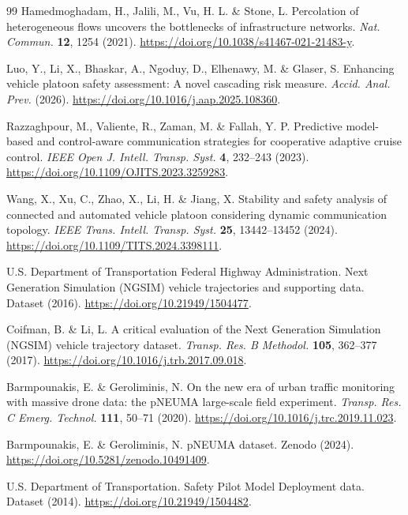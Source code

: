 \documentclass[10pt,a4paper,twocolumn]{article}
\begin{document}
\begin{thebibliography}{99}
Hamedmoghadam, H., Jalili, M., Vu, H. L. \& Stone, L. Percolation of heterogeneous flows uncovers the bottlenecks of infrastructure networks. \textit{Nat. Commun.} \textbf{12}, 1254 (2021). \url{https://doi.org/10.1038/s41467-021-21483-y}.

Luo, Y., Li, X., Bhaskar, A., Ngoduy, D., Elhenawy, M. \& Glaser, S. Enhancing vehicle platoon safety assessment: A novel cascading risk measure. \textit{Accid. Anal. Prev.} (2026). \url{https://doi.org/10.1016/j.aap.2025.108360}.

Razzaghpour, M., Valiente, R., Zaman, M. \& Fallah, Y. P. Predictive model-based and control-aware communication strategies for cooperative adaptive cruise control. \textit{IEEE Open J. Intell. Transp. Syst.} \textbf{4}, 232--243 (2023). \url{https://doi.org/10.1109/OJITS.2023.3259283}.

Wang, X., Xu, C., Zhao, X., Li, H. \& Jiang, X. Stability and safety analysis of connected and automated vehicle platoon considering dynamic communication topology. \textit{IEEE Trans. Intell. Transp. Syst.} \textbf{25}, 13442--13452 (2024). \url{https://doi.org/10.1109/TITS.2024.3398111}.

U.S. Department of Transportation Federal Highway Administration. Next Generation Simulation (NGSIM) vehicle trajectories and supporting data. Dataset (2016). \url{https://doi.org/10.21949/1504477}.

Coifman, B. \& Li, L. A critical evaluation of the Next Generation Simulation (NGSIM) vehicle trajectory dataset. \textit{Transp. Res. B Methodol.} \textbf{105}, 362--377 (2017). \url{https://doi.org/10.1016/j.trb.2017.09.018}.

Barmpounakis, E. \& Geroliminis, N. On the new era of urban traffic monitoring with massive drone data: the pNEUMA large-scale field experiment. \textit{Transp. Res. C Emerg. Technol.} \textbf{111}, 50--71 (2020). \url{https://doi.org/10.1016/j.trc.2019.11.023}.

Barmpounakis, E. \& Geroliminis, N. pNEUMA dataset. Zenodo (2024). \url{https://doi.org/10.5281/zenodo.10491409}.

U.S. Department of Transportation. Safety Pilot Model Deployment data. Dataset (2014). \url{https://doi.org/10.21949/1504482}.


\end{thebibliography}
\end{document}
